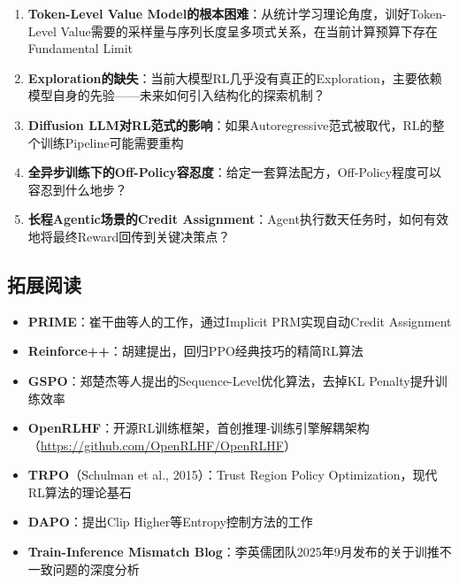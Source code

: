 \documentclass[a4paper]{article}
\begin{document}
\begin{enumerate}
    \item \textbf{Token-Level Value Model的根本困难}：从统计学习理论角度，训好Token-Level Value需要的采样量与序列长度呈多项式关系，在当前计算预算下存在Fundamental Limit
    \item \textbf{Exploration的缺失}：当前大模型RL几乎没有真正的Exploration，主要依赖模型自身的先验——未来如何引入结构化的探索机制？
    \item \textbf{Diffusion LLM对RL范式的影响}：如果Autoregressive范式被取代，RL的整个训练Pipeline可能需要重构
    \item \textbf{全异步训练下的Off-Policy容忍度}：给定一套算法配方，Off-Policy程度可以容忍到什么地步？
    \item \textbf{长程Agentic场景的Credit Assignment}：Agent执行数天任务时，如何有效地将最终Reward回传到关键决策点？
\end{enumerate}

\subsection{拓展阅读}

\begin{itemize}
    \item \textbf{PRIME}：崔干曲等人的工作，通过Implicit PRM实现自动Credit Assignment
    \item \textbf{Reinforce++}：胡建提出，回归PPO经典技巧的精简RL算法
    \item \textbf{GSPO}：郑楚杰等人提出的Sequence-Level优化算法，去掉KL Penalty提升训练效率
    \item \textbf{OpenRLHF}：开源RL训练框架，首创推理-训练引擎解耦架构（\url{https://github.com/OpenRLHF/OpenRLHF}）
    \item \textbf{TRPO}（Schulman et al., 2015）：Trust Region Policy Optimization，现代RL算法的理论基石
    \item \textbf{DAPO}：提出Clip Higher等Entropy控制方法的工作
    \item \textbf{Train-Inference Mismatch Blog}：李英儒团队2025年9月发布的关于训推不一致问题的深度分析
\end{itemize}

\end{document}

